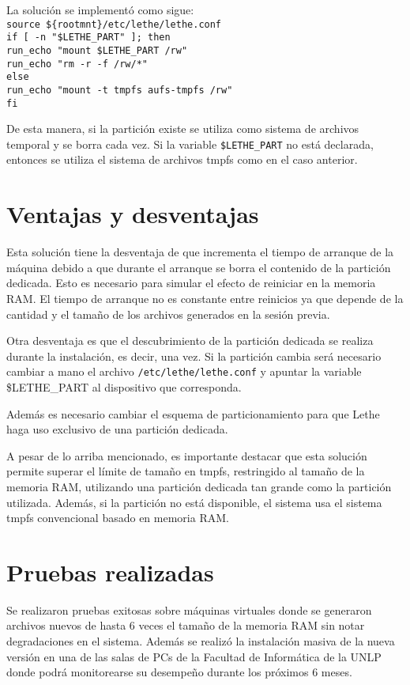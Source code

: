 \documentclass[a4paper,10pt]{article}
\begin{document}
La solución se implementó como sigue:
\\\texttt{source \$\{rootmnt\}/etc/lethe/lethe.conf}
\\\texttt{if [ -n "\$LETHE\_PART" ]; then}
\\\texttt{\indent run\_echo "mount \$LETHE\_PART /rw"}
\\\texttt{\indent run\_echo "rm -r -f /rw/*"}
\\\texttt{else}
\\\texttt{\indent run\_echo "mount -t tmpfs aufs-tmpfs /rw"}
\\\texttt{fi}

De esta manera, si la partición existe se utiliza como sistema de archivos temporal y se borra cada vez. Si la variable
\texttt{\$LETHE\_PART} no está declarada, entonces se utiliza el sistema de archivos tmpfs como en el caso anterior.

\section{Ventajas y desventajas}
Esta solución tiene la desventaja de que incrementa el tiempo de arranque de la máquina debido a que durante el arranque se
borra el contenido de la partición dedicada. Esto es necesario para simular el efecto de reiniciar en la memoria RAM. El
tiempo de arranque no es constante entre reinicios ya que depende de la cantidad y el tamaño de los archivos generados en la
sesión previa. 

Otra desventaja es que el descubrimiento de la partición dedicada se realiza durante la instalación, es decir, una vez. Si la
partición cambia será necesario cambiar a mano el archivo \texttt{/etc/lethe/lethe.conf} y apuntar la variable \$LETHE\_PART
al dispositivo que corresponda.

Además es necesario cambiar el esquema de particionamiento para que Lethe haga uso exclusivo de una partición dedicada.

A pesar de lo arriba mencionado, es importante destacar que esta solución permite superar el límite de tamaño en tmpfs,
restringido al tamaño de la memoria RAM, utilizando una partición
dedicada tan grande como la partición utilizada. Además, si la partición no está disponible, el sistema usa el sistema tmpfs
convencional basado en memoria RAM.

\section{Pruebas realizadas}
Se realizaron pruebas exitosas sobre máquinas virtuales donde se generaron archivos nuevos de hasta 6 veces el tamaño de la
memoria RAM sin notar degradaciones en el sistema. Además se realizó la instalación masiva de la nueva versión en una de las
salas de PCs de la Facultad de Informática de la UNLP donde podrá monitorearse su desempeño durante los próximos 6
meses.
\end{document}
